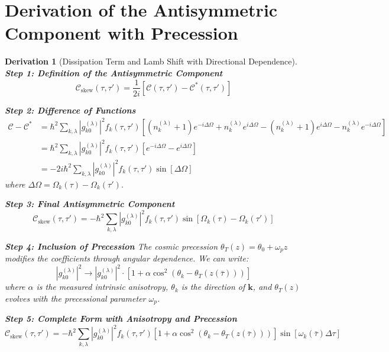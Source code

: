 \documentclass[10pt, a4paper]{article}
\newtheorem{derivation}{Derivation}
\begin{document}
\section{Derivation of the Antisymmetric Component with Precession}

\begin{derivation}[Dissipation Term and Lamb Shift with Directional Dependence]
\textbf{Step 1: Definition of the Antisymmetric Component}
\begin{equation}
\mathcal{C}_{\text{skew}}(\tau, \tau') = \frac{1}{2i} [\mathcal{C}(\tau, \tau') - \mathcal{C}^*(\tau, \tau')]
\tag{17.1}
\end{equation}

\textbf{Step 2: Difference of Functions}
\begin{align}
\mathcal{C} - \mathcal{C}^* &= \hbar^2 \sum_{k,\lambda} |g_{k0}^{(\lambda)}|^2 f_k(\tau, \tau') \left[ (n_k^{(\lambda)}+1) e^{-i\Delta\Omega} + n_k^{(\lambda)} e^{i\Delta\Omega} - (n_k^{(\lambda)}+1) e^{i\Delta\Omega} - n_k^{(\lambda)} e^{-i\Delta\Omega} \right] \\
&= \hbar^2 \sum_{k,\lambda} |g_{k0}^{(\lambda)}|^2 f_k(\tau, \tau') \left[ e^{-i\Delta\Omega} - e^{i\Delta\Omega} \right] \\
&= -2i\hbar^2 \sum_{k,\lambda} |g_{k0}^{(\lambda)}|^2 f_k(\tau, \tau') \sin[\Delta\Omega]
\tag{17.2}
\end{align}
where $\Delta\Omega = \Omega_k(\tau) - \Omega_k(\tau')$.

\textbf{Step 3: Final Antisymmetric Component}
\begin{equation}
\mathcal{C}_{\text{skew}}(\tau, \tau') = -\hbar^2 \sum_{k,\lambda} |g_{k0}^{(\lambda)}|^2 f_k(\tau, \tau') \sin[\Omega_k(\tau) - \Omega_k(\tau')]
\tag{17.3}
\end{equation}

\textbf{Step 4: Inclusion of Precession}
The cosmic precession $\theta_T(z) = \theta_0 + \omega_p z$ modifies the coefficients through angular dependence. We can write:
\begin{equation}
|g_{k0}^{(\lambda)}|^2 \rightarrow |g_{k0}^{(\lambda)}|^2 \cdot [1 + \alpha \cos^2(\theta_k - \theta_T(z(\bar{\tau})))]
\tag{17.4}
\end{equation}
where $\alpha$ is the measured intrinsic anisotropy, $\theta_k$ is the direction of $\mathbf{k}$, and $\theta_T(z)$ evolves with the precessional parameter $\omega_p$.

\textbf{Step 5: Complete Form with Anisotropy and Precession}
\begin{equation}
\mathcal{C}_{\text{skew}}(\tau, \tau') = -\hbar^2 \sum_{k,\lambda} |g_{k0}^{(\lambda)}|^2 f_k(\tau, \tau') [1 + \alpha \cos^2(\theta_k - \theta_T(z(\bar{\tau})))] \sin[\omega_k(\bar{\tau}) \Delta\tau]
\tag{17.5}
\end{equation}


\end{derivation}
\end{document}
